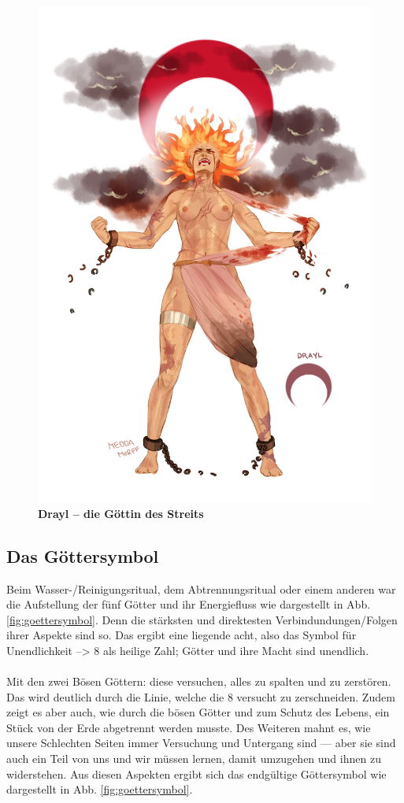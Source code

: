 \begin{figure}[tbh]
	\centering
	\includegraphics[width=0.6\linewidth]{Abbildungen/Gesellschaft/Religion/drayl}
	\caption[Drayl -- Göttin des Streits]{\textbf{Drayl -- die Göttin des Streits}}
	\label{fig:drayl}
\end{figure}




\subsection{Das Göttersymbol} \label{sec:goettersymbol}
Beim Wasser-/Reinigungsritual, dem Abtrennungsritual oder einem anderen war die Aufstellung der fünf Götter und ihr Energiefluss wie dargestellt in Abb. \ref{fig:goettersymbol}. 
Denn die stärksten und direktesten Verbindundungen/Folgen ihrer Aspekte sind so. 
Das ergibt eine liegende acht, also das Symbol für Unendlichkeit --> 8 als heilige Zahl; 
Götter und ihre Macht sind unendlich.\\
\\
Mit den zwei Bösen Göttern: diese versuchen, alles zu spalten und zu zerstören. 
Das wird deutlich durch die Linie, welche die 8 versucht zu zerschneiden. 
Zudem zeigt es aber auch, wie durch die bösen Götter und zum Schutz des Lebens, ein Stück von der Erde abgetrennt werden musste. 
Des Weiteren mahnt es, wie unsere Schlechten Seiten immer Versuchung und Untergang sind — aber sie sind auch ein Teil von uns und wir müssen lernen, damit umzugehen und ihnen zu widerstehen. 
Aus diesen Aspekten ergibt sich das endgültige Göttersymbol wie dargestellt in Abb. \ref{fig:goettersymbol}.\\

